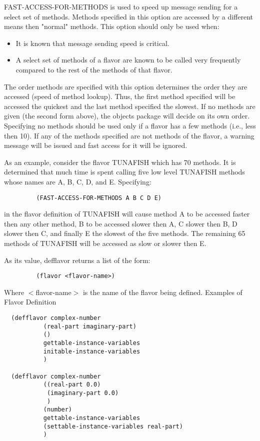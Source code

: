     FAST-ACCESS-FOR-METHODS  is used to speed up message sending
    for a select set of  methods.   Methods  specified  in  this
    option  are  accessed  by  a  different  means then "normal"
    methods.  This option should only be used when:

\begin{itemize}
\item It is known that message sending speed is critical.
\item A select set of methods of a flavor  are  known  to  be
         called  very  frequently  compared  to  the rest of the
         methods of that flavor.
\end{itemize}

    The order methods are specified with this option  determines
    the order they are accessed (speed of method lookup).  Thus,
    the first method specified will be accessed the quickest and
    the  last  method  specified the slowest.  If no methods are
    given (the second form  above),  the  objects  package  will
    decide  on  its  own order.  Specifying no methods should be
    used only if a flavor has a few  methods  (i.e.,  less  then
    10).  If any of the methods specified are not methods of the
    flavor, a warning message will be issued and fast access for
    it will be ignored.

    As  an  example,  consider  the flavor TUNAFISH which has 70
    methods.  It is determined that much time is  spent  calling
    five  low level TUNAFISH methods whose names are A, B, C, D,
    and E.  Specifying:

\begin{verbatim}
         (FAST-ACCESS-FOR-METHODS A B C D E)
\end{verbatim}

    in the flavor definition of TUNAFISH will cause method A  to
    be  accessed  faster then any other method, B to be accessed
    slower then A, C slower then B, D slower then C, and finally
    E the slowest of the five methods.  The remaining 65 methods
    of TUNAFISH will be accessed as slow or slower then E.

    As its value, defflavor returns a list of the form:

\begin{verbatim}
         (flavor <flavor-name>)
\end{verbatim}
    Where $<$flavor-name$>$ is the name of the flavor being defined.
  Examples of Flavor Definition

\begin{verbatim}
  (defflavor complex-number
           (real-part imaginary-part)
           ()
           gettable-instance-variables
           initable-instance-variables
           )

  (defflavor complex-number
           ((real-part 0.0)
            (imaginary-part 0.0)
            )
           (number)
           gettable-instance-variables
           (settable-instance-variables real-part)
           )
\end{verbatim}
